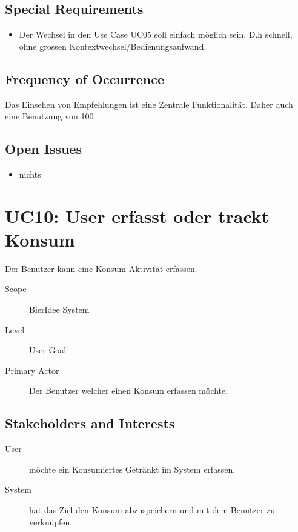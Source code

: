 \documentclass[10pt,a4paper]{scrartcl}
\begin{document}
\subsection*{Special Requirements}

\begin{itemize}
\item Der Wechsel in den Use Case UC05 soll einfach möglich sein. D.h schnell, ohne grossen Kontextwechsel/Bedienungsaufwand.
\end{itemize}



\subsection*{Frequency of Occurrence}

Das Einsehen von Empfehlungen ist eine Zentrale Funktionalität. Daher auch eine Benutzung von 100%

\subsection*{Open Issues}

\begin{itemize}
\item nichts
\end{itemize}


\section*{UC10: User erfasst oder trackt Konsum}
Der Benutzer kann eine Konsum Aktivität erfassen.

\begin{description}
\item[Scope] BierIdee System
\item[Level] User Goal
\item[Primary Actor] Der Benutzer welcher einen Konsum erfassen möchte.
\end{description}


\subsection*{Stakeholders and Interests}

\begin{description}
\item[User] möchte ein Konsumiertes Getränkt im System erfassen.
\item[System] hat das Ziel den Konsum abzuspeichern und mit dem Benutzer zu verknüpfen.
\end{description}
\end{document}
